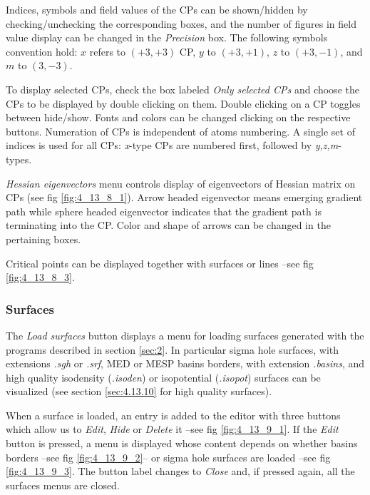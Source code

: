 \documentclass[10pt]{article}
\begin{document}
Indices, symbols and field values of the CPs can be shown/hidden by checking/unchecking the 
corresponding boxes, and the number of figures in field value display can be changed in the {\it Precision}
box. The following symbols convention hold: $x$ refers to $(+3,+3)$ CP, 
$y$ to $(+3,+1)$, $z$ to $(+3,-1)$, and $m$ to $(3,-3)$.

To display selected CPs, check the box labeled {\it Only selected CPs} and choose the CPs 
to be displayed by double clicking on them. Double clicking on a CP toggles between hide/show.
Fonts and colors can be changed clicking on the respective buttons. Numeration of CPs is independent of
atoms numbering. A single set of indices is used for all CPs: {\it x}-type CPs are numbered first, 
followed by {\it y,z,m}-types.

{\it Hessian eigenvectors} menu controls display of eigenvectors of 
Hessian matrix on CPs (see fig \ref{fig:4_13_8_1}).
Arrow headed eigenvector means emerging gradient path while sphere headed eigenvector indicates that 
the gradient path is terminating into the CP. Color and shape of arrows can be changed in the pertaining 
boxes.

Critical points can be displayed together with surfaces or lines --see fig \ref{fig:4_13_8_3}.

\subsubsection{Surfaces \label{sec:4.13.9}}

The {\it Load surfaces} button displays a menu for loading surfaces
generated with the programs described in section \ref{sec:2}. In particular 
sigma hole surfaces, with extensions {\it .sgh} or
{\it .srf}, MED or MESP basins borders, with extension 
{\it .basins}, and high quality isodensity ({\it .isoden}) 
or isopotential ({\it .isopot}) surfaces can be visualized 
(see section \ref{sec:4.13.10} for high quality surfaces).

When a surface is loaded, an entry is added to the editor with three buttons which allow us to
{\it Edit}, {\it Hide} or {\it Delete} it --see fig \ref{fig:4_13_9_1}. If the
{\it Edit} button is pressed, a menu is displayed whose content depends on whether basins borders
--see fig \ref{fig:4_13_9_2}-- or sigma hole surfaces are loaded --see fig \ref{fig:4_13_9_3}.
The button label changes to {\it Close} and, if pressed again, all the surfaces menus are closed.
\end{document}
